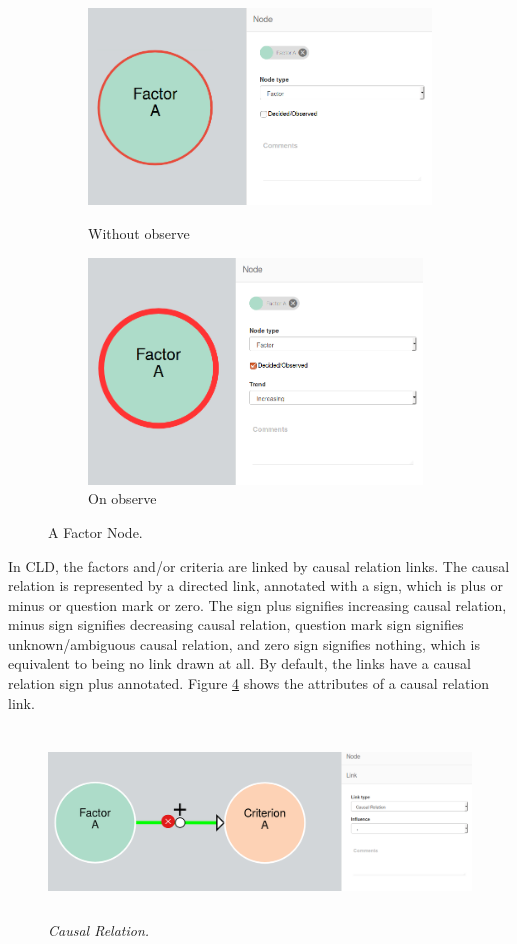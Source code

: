 \documentclass[a4paper]{article}
\begin{document}
\begin{figure}[H]
\begin{subfigure}{1.0\textwidth}
\includegraphics[width=0.75\linewidth, height=6cm]{img/factor.png} 
\caption{Without observe}
\label{fig:factor}
\end{subfigure}
\begin{subfigure}{1.0\textwidth}
\includegraphics[width=0.75\linewidth, height=6cm]{img/factor1.png}
\caption{On observe}
\label{fig:factor1}
\end{subfigure}
\caption{A Factor Node.}
\label{fig:factors}
\end{figure}

In CLD, the factors and/or criteria are linked by causal relation links. The causal relation is represented by a directed link, annotated with a sign, which is plus or minus or question mark or zero. The sign plus signifies increasing causal relation, minus sign signifies decreasing causal relation, question mark sign signifies unknown/ambiguous causal relation, and zero sign signifies nothing, which is equivalent to being no link drawn at all. By default, the links have a causal relation sign plus annotated. Figure \ref{fig:links} shows the attributes of a causal relation link.

\begin{figure}[H]
\begin{center}
\includegraphics[width=1.0\linewidth, height=5cm]{img/links.png}
\caption{\small \sl Causal Relation.\label{fig:links}}
\end{center}
\end{figure}
\end{document}
